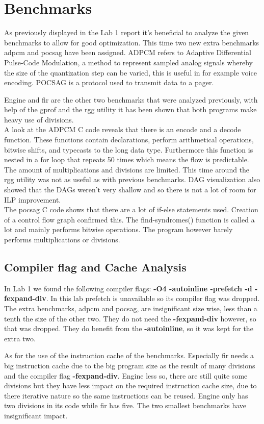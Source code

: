 \section{Benchmarks}
\label{sec:benchmarks}
As previously displayed in the Lab 1 report it's beneficial to analyze the given benchmarks to allow for good optimization.
This time two new extra benchmarks adpcm and pocsag have been assigned.
ADPCM refers to Adaptive Differential Pulse-Code Modulation, a method to represent sampled analog signals whereby the size of the quantization step can be varied, this is useful in for example voice encoding.
POCSAG is a protocol used to transmit data to a pager.


Engine and fir are the other two benchmarks that were analyzed previously, with help of the gprof and the rgg utility it has been shown that both programs make heavy use of divisions.\\
A look at the ADPCM C code reveals that there is an encode and a decode function. 
These functions contain declarations, perform arithmetical operations, bitwise shifts, and typecasts to the long data type. 
Furthermore this function is nested in a for loop that repeats 50 times which means the flow is predictable. 
The amount of multiplications and divisions are limited. 
This time around the rgg utility was not as useful as with previous benchmarks. 
DAG visualization also showed that the DAGs weren't very shallow and so there is not a lot of room for ILP improvement.\\
The pocsag C code shows that there are a lot of if-else statements used. 
Creation of a control flow graph confirmed this.
The find-syndromes() function is called a lot and mainly performs bitwise operations. 
The program however barely performs multiplications or divisions.

\subsection{Compiler flag and Cache Analysis}
\label{ssec:benchmarks-analysis}
In Lab 1 we found the following compiler flags: \textbf{-O4 -autoinline -prefetch -d -fexpand-div}.
In this lab prefetch is unavailable so its compiler flag was dropped.
The extra benchmarks, adpcm and pocsag, are insignificant size wise, less than a tenth the size of the other two.
They do not need the \textbf{-fexpand-div} however, so that was dropped.
They do benefit from the \textbf{-autoinline}, so it was kept for the extra two.

As for the use of the instruction cache of the benchmarks.
Especially fir needs a big instruction cache due to the big program size as the result of many divisions and the compiler flag \textbf{-fexpand-div}.
Engine less so, there are still quite some divisions but they have less impact on the required instruction cache size, due to there iterative nature so the same instructions can be reused.
Engine only has two divisions in its code while fir has five.
The two smallest benchmarks have insignificant impact.

